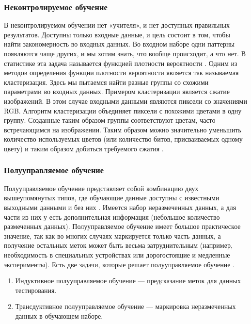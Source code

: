 \subsubsection{Неконтролируемое обучение}

В неконтролируемом обучении нет «учителя», и нет доступных правильных результатов. Доступны только входные данные, и цель состоит в том, чтобы найти закономерность во входных данных. Во входном наборе одни паттерны появляются чаще других, и мы хотим знать, что вообще происходит, а что нет. В статистике эта задача называется функцией плотности вероятности \cite{surverymashin}.
Одним из методов определения функции плотности вероятности является так называемая кластеризация. Здесь мы пытаемся найти разные группы со схожими параметрами во входных данных. Примером кластеризации является сжатие изображений. В этом случае входными данными являются пиксели со значениями RGB. Алгоритм кластеризации объединяет пиксели с похожими цветами в одну группу. Созданные таким образом группы соответствуют цветам, часто встречающимся на изображении. Таким образом можно значительно уменьшить количество используемых цветов (или количество битов, присваиваемых одному цвету) и таким образом добиться требуемого сжатия \cite{introdmachlearn}.

\subsubsection{Полууправляемое обучение}

Полууправляемое обучение представляет собой комбинацию двух вышеупомянутых типов, где обучающие данные доступны с известными выходными данными и без них \cite{surverymashin}. Имеется набор неразмеченных данных, а для части из них у есть дополнительная информация (небольшое количество размеченных данных). Полууправляемое обучение имеет большое практическое значение, так как во многих случаях маркируется только часть данных, а получение остальных меток может быть весьма затруднительным (например, необходимость в специальных устройствах или дорогостоящие и медленные эксперименты). Есть две задачи, которые решает полууправляемое обучение \cite{transactonne}.
\begin{enumerate}[label=\arabic*)]
	\item Индуктивное полууправляемое обучение --- предсказание меток для данных тестирования.
	\item Трансдуктивное полууправляемое обучение --- маркировка неразмеченных данных в обучающем наборе.
\end{enumerate}

